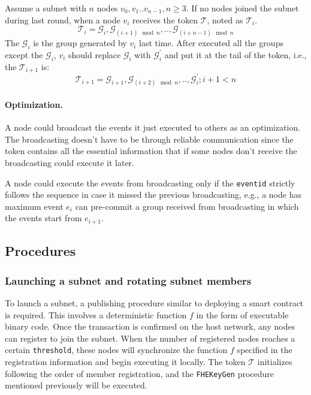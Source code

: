 \documentclass[11pt]{article}
\begin{document}
Assume a subnet with $n$ nodes \( v_{0}, v_{1} .. v_{n-1}, n\geq 3\). If no nodes joined the subnet during last round, when a node $v_{i}$ receives the token $\mathcal{T}$, noted as $\mathcal{T}_{i}$.
\begin{equation}
\mathcal{T}_{i} = \mathcal{G}_{i}, \mathcal{G}_{(i + 1)\mod n},.., \mathcal{G}_{(i + n - 1)\mod n}
\end{equation}
The $\mathcal{G}_{i}$ is the group generated by $v_{i}$ last time. After executed all the groups except the $\mathcal{G}_{i}$, $v_{i}$ should replace $\mathcal{G}_{i}$ with $\mathcal{G}_{i}^{\prime}$ and put it at the tail of the token, i.e., the $\mathcal{T}_{i+1}$ is:
\begin{equation}
\mathcal{T}_{i+1} = \mathcal{G}_{i+1}, \mathcal{G}_{(i+2)\mod n},.., \mathcal{G}_{i}^{\prime}; i+1<n
\end{equation}

\paragraph{Optimization.} A node could broadcast the events it just executed to others as an optimization.
The broadcasting doesn{'}t have to be through reliable communication since the token contains all the essential information that if some nodes don{'}t receive the broadcasting could execute it later.

A node could execute the events from broadcasting only if the \texttt{eventid} strictly follows the sequence in case it missed the previous broadcasting, e.g., a node has maximum event $e_{i}$ can pre-commit a group received from broadcasting in which the events start from $e_{i+1}$.


\subsection{Procedures}
\subsubsection{Launching a subnet and rotating subnet members}
\label{sec:launch_subnet_and_rotate}

To launch a subnet, a publishing procedure similar to deploying a smart contract is required. This involves a deterministic function $f$ in the form of executable binary code. Once the transaction is confirmed on the host network, any nodes can register to join the subnet. When the number of registered nodes reaches a certain \texttt{threshold}, these nodes will synchronize the function $f$ specified in the registration information and begin executing it locally. The token $\mathcal{T}$ initializes following the order of member registration, and the \texttt{FHEKeyGen} procedure mentioned previously will be executed.
\end{document}
